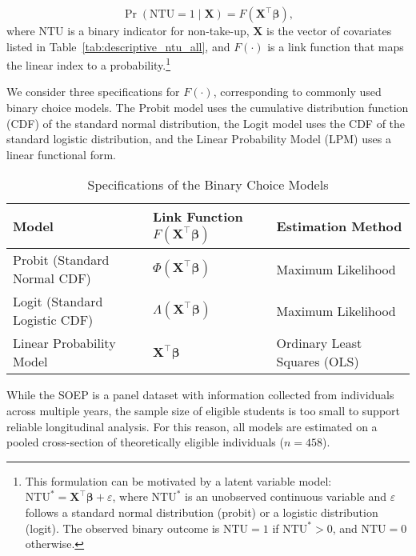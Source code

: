 \begin{equation}
  \Pr(\mathrm{NTU} = 1 \mid \mathbf{X}) = F(\mathbf{X}^\top \boldsymbol{\beta}),
\end{equation}
where \( \mathrm{NTU} \) is a binary indicator for non-take-up, \( \mathbf{X} \) is the vector of covariates listed in Table~\ref{tab:descriptive_ntu_all}, and \( F(\cdot) \) is a link function that maps the linear index to a probability.\footnote{
This formulation can be motivated by a latent variable model: \( \mathrm{NTU}^* = \mathbf{X}^\top \boldsymbol{\beta} + \varepsilon \), where \( \mathrm{NTU}^* \) is an unobserved continuous variable and \( \varepsilon \) follows a standard normal distribution (probit) or a logistic distribution (logit). The observed binary outcome is \( \mathrm{NTU} = 1 \) if \( \mathrm{NTU}^* > 0 \), and \( \mathrm{NTU} = 0 \) otherwise.
}

We consider three specifications for \( F(\cdot) \), corresponding to commonly used binary choice models. 
The Probit model uses the cumulative distribution function (CDF) of the standard normal distribution, the Logit model uses the CDF of the standard logistic distribution, and the Linear Probability Model (LPM) uses a linear functional form.

\begin{table}[H]
\footnotesize
\centering
\begin{tabular}{@{}lll@{}}
\toprule
\textbf{Model} & \textbf{Link Function \( F(\mathbf{X}^\top \boldsymbol{\beta}) \)} & \textbf{Estimation Method} \\ \midrule
Probit (Standard Normal CDF) & \( \Phi(\mathbf{X}^\top \boldsymbol{\beta}) \) & Maximum Likelihood \\
Logit (Standard Logistic CDF) & \( \Lambda(\mathbf{X}^\top \boldsymbol{\beta}) \) & Maximum Likelihood \\
Linear Probability Model & \( \mathbf{X}^\top \boldsymbol{\beta} \) & Ordinary Least Squares (OLS) \\
\bottomrule
\end{tabular}
\caption{Specifications of the Binary Choice Models}
\end{table}

While the SOEP is a panel dataset with information collected from individuals across multiple years, the sample size of eligible students is too small to support reliable longitudinal analysis. For this reason, all models are estimated on a pooled cross-section of theoretically eligible individuals (\( n = 458 \)).

